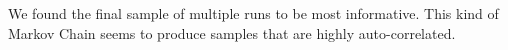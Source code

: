 We found the final sample of multiple runs to be most informative. This kind of Markov Chain seems to produce samples that are highly auto-correlated.

